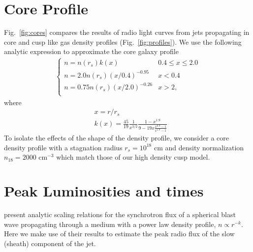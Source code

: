 \documentclass[usenatbib,fleqn]{mnras}
\begin{document}
\appendix
\section{Core Profile}
\label{app:core}
Fig.~\ref{fig:cores} compares the results of radio light curves from jets propagating in core and cusp like gas density
profiles (Fig.~\ref{fig:profiles}).  We use the following analytic expression to approximate the core
galaxy profile
\begin{align}
\begin{cases}
n=n(r_s) k(x) & 0.4 \leq x\leq 2.0\\
n = 2.0 n(r_s) (x/0.4)^{-0.95} & x < 0.4\\
n = 0.75 n(r_s) (x/2.0)^{-0.26} & x>2,\\
\end{cases}
\label{eq:cores}
\end{align}
where
\begin{align}
  &x=r/r_s\\\nonumber
  &k(x)=\frac{45}{19} \frac{1}{x^{3/2}} \frac{1-x^{1.9}}{9-19
      x\frac{x^{0.9}-1}{x^{1.9}-1}}
\end{align}
To isolate the effects of the shape of the density profile, we consider a
core density profile with a stagnation radius $r_s=10^{18}$ cm and density normalization $n_{18}=2000$
cm$^{-3}$ which match those of our high density cusp model.

\section{Peak Luminosities and times}
\label{app:analyt}
\citet{Leventis+2012} present analytic scaling relations for the
synchrotron flux of a spherical blast wave propagating through a
medium with a power law density profile, $n\propto r^{-k}$.  Here we
make use of their results to estimate the peak radio flux of the slow
(sheath) component of the jet.
\end{document}
